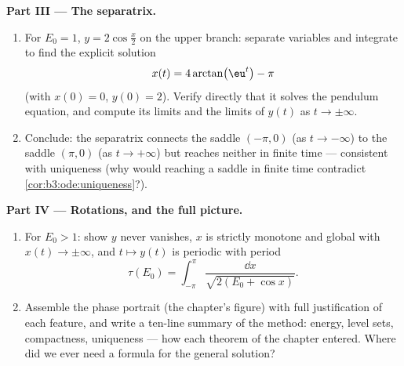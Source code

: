 \begin{problem}
\medskip
\noindent\textbf{Part III --- The separatrix.}
\begin{enumerate}[resume]
  \item For $E_0 = 1$, $y = 2\cos\frac x2$ on the upper
        branch: separate variables and integrate to find the
        explicit solution
        \[
        x(t) = 4\arctan\bigl(\eu^{t}\bigr) - \pi
        \]
        (with $x(0) = 0$, $y(0) = 2$). Verify directly that
        it solves the pendulum equation, and compute its
        limits and the limits of $y(t)$ as $t \to
        \pm\infty$.
  \item Conclude: the separatrix  connects the saddle
        $(-\pi, 0)$ (as $t \to -\infty$) to the saddle
        $(\pi, 0)$ (as $t \to +\infty$) but reaches neither
        in finite time --- consistent with uniqueness (why
        would reaching a saddle in finite time contradict
        \cref{cor:b3:ode:uniqueness}?).
\end{enumerate}

\medskip
\noindent\textbf{Part IV --- Rotations, and the full
picture.}
\begin{enumerate}[resume]
  \item For $E_0 > 1$: show $y$ never vanishes, $x$ is
        strictly monotone and global with $x(t) \to
        \pm\infty$, and $t \mapsto y(t)$ is periodic with
        period
        \[
        \tau(E_0) = \int_{-\pi}^{\pi}
        \frac{\dd x}{\sqrt{2(E_0 + \cos x)}} .
        \]
  \item Assemble the  phase portrait (the chapter's
        figure) with full justification of each feature, and
        write a ten-line summary of the method: energy,
        level sets, compactness, uniqueness --- how each
        theorem of the chapter entered. Where did we ever
        need a formula for the general solution?
\end{enumerate}


\end{problem}
